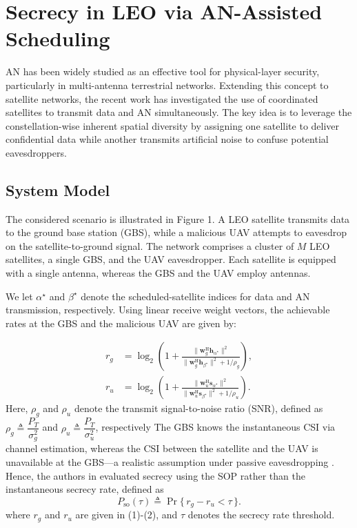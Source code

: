 \documentclass[conference]{IEEEtran}
\begin{document}
\section{Secrecy in LEO via AN-Assisted Scheduling} \label{sec3}
AN has been widely studied as an effective tool for physical-layer security, particularly in multi-antenna terrestrial networks. Extending this concept to satellite networks, the recent work\cite{YLee:25} has investigated the use of coordinated satellites to transmit data and AN simultaneously. The key idea is to leverage the constellation-wise inherent spatial diversity by assigning one satellite to deliver confidential data while another transmits artificial noise to confuse potential eavesdroppers.

\subsection{System Model} \label{sec3.1}
The considered scenario is illustrated in Figure 1. A LEO satellite transmits data to the ground base station (GBS), while a malicious UAV attempts to eavesdrop on the satellite-to-ground signal. The network comprises a cluster of $M$ LEO satellites, a single GBS, and the UAV eavesdropper. Each satellite is equipped with a single
antenna, whereas the GBS and the UAV employ antennas.

We let $\alpha^\star$ and $\beta^\star$ denote the scheduled-satellite indices for data and AN transmission, respectively. Using linear receive weight vectors, the achievable rates at the GBS and the malicious UAV are given by\cite{YLee:25}:

\begin{align}
r_g &= \log_2\!\left(
  1 + \frac{\lVert \mathbf{w}_g^{\mathrm H}\mathbf{h}_{\alpha^\star} \rVert^{2}}
           {\lVert \mathbf{w}_g^{\mathrm H}\mathbf{h}_{\beta^\star} \rVert^{2} + 1/\rho_g}
\right), \tag{1}\\[2mm]
r_u &= \log_2\!\left(
  1 + \frac{\lVert \mathbf{w}_u^{\mathrm H}\mathbf{s}_{\alpha^\star} \rVert^{2}}
           {\lVert \mathbf{w}_u^{\mathrm H}\mathbf{s}_{\beta^\star} \rVert^{2} + 1/\rho_u}
\right). \tag{2}
\end{align}Here, $\rho_g$ and $\rho_u$ denote the transmit signal-to-noise ratio (SNR),
defined as $\rho_g \triangleq \dfrac{P_T}{\sigma_g^{2}}$ and
$\rho_u \triangleq \dfrac{P_T}{\sigma_u^{2}}$, respectively
The GBS knows the instantaneous CSI via channel estimation, whereas the CSI between the satellite and the UAV is unavailable at the GBS—a realistic assumption under passive eavesdropping \cite{YLee:25}. Hence, the authors in \cite{YLee:25} evaluated secrecy using the SOP rather than the instantaneous secrecy rate, defined as
\begin{equation}
P_{\mathrm{so}}(\tau) \triangleq \Pr\{\, r_g - r_u < \tau \,\}. \tag{3}
\end{equation}where $r_g$ and $r_u$ are given in (1)-(2), and $\tau$ denotes the secrecy rate threshold.
\end{document}
